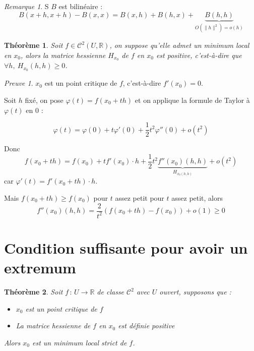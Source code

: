 \documentclass[]{article}
\newtheorem{mythm}{Théorème}
\theoremstyle{remark}
\newtheorem{myrem}{Remarque}
\newtheorem{myproof}{Preuve}
\theoremstyle{definition}
\newcommand{\funcshort}[3]{
#1 \, : \, #2 \longrightarrow #3
}
\begin{document}
\begin{myrem}
	S $B$ est bilinéaire :
	$$B(x+h, x+h) - B(x, x) = B(x, h) + B(h, x) + \underbrace{B(h, h)}_{O(\|h\|^2) = o(h)}$$
\end{myrem}

\begin{mythm}
	Soit $f \in \mathcal{C}^2(U, \mathbb{R})$, on suppose qu'elle admet un minimum local en $x_0$, alors la matrice hessienne $H_{x_0}$ de $f$ en $x_0$ est positive, c'est-à-dire que $\forall h, ~ H_{x_0}(h, h) \geqslant 0$.
\end{mythm}

\begin{myproof}
	$x_0$ est un point critique de $f$, c'est-à-dire $f'(x_0) = 0$.
	
	Soit $h$ fixé, on pose $\varphi(t) = f(x_0 + th)$ et on applique la formule de Taylor à $\varphi(t)$ en 0 :
	
	$$\varphi(t) = \varphi(0) + t \varphi'(0) + \frac{1}{2} t^2 \varphi''(0) + o(t^2)$$
	
	Donc $$f(x_0 + th) = f(x_0) + t f'(x_0) \cdot h + \frac{1}{2} t^2 \underbrace{f''(x_0)(h, h)}_{H_{x_0 (h, h)}} + o(t^2)$$ car $\varphi'(t) = f'(x_0 + th) \cdot
	h$.
	
	Mais $f(x_0+th) \geqslant f(x_0)$ pour $t$ assez petit pour $t$ assez petit, alors $$f''(x_0)(h, h) = \frac{2}{t^2}(f(x_0+th) - f(x_0)) + o(1) \geqslant 0$$
\end{myproof}

\section{Condition suffisante pour avoir un extremum}

\begin{mythm}
	Soit $\funcshort{f}{U}{\mathbb{R}}$ de classe $\mathcal{C}^2$ avec $U$ ouvert, supposons que :
	\begin{itemize}
		\item $x_0$ est un point critique de $f$
		\item La matrice hessienne de $f$ en $x_0$ est définie positive
	\end{itemize}
	Alors $x_0$ est un minimum local strict de $f$.
\end{mythm}
\end{document}

